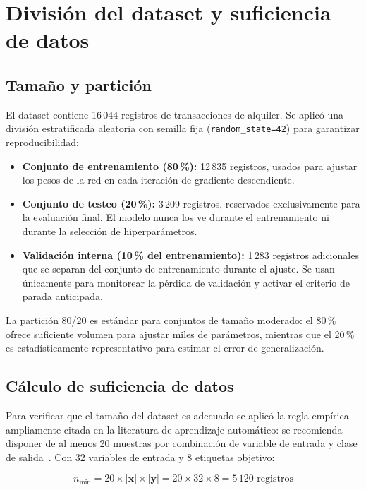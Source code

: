 \documentclass[12pt, a4paper]{report}
\begin{document}
\section{División del dataset y suficiencia de datos}

\subsection{Tamaño y partición}

El dataset contiene 16\,044 registros de transacciones de alquiler. Se aplicó una división estratificada aleatoria con semilla fija (\texttt{random\_state=42}) para garantizar reproducibilidad:

\begin{itemize}
  \item \textbf{Conjunto de entrenamiento (80\,\%):} 12\,835 registros, usados para ajustar los pesos de la red en cada iteración de gradiente descendiente.
  \item \textbf{Conjunto de testeo (20\,\%):} 3\,209 registros, reservados exclusivamente para la evaluación final. El modelo nunca los ve durante el entrenamiento ni durante la selección de hiperparámetros.
  \item \textbf{Validación interna (10\,\% del entrenamiento):} 1\,283 registros adicionales que se separan del conjunto de entrenamiento durante el ajuste. Se usan únicamente para monitorear la pérdida de validación y activar el criterio de parada anticipada.
\end{itemize}

La partición 80/20 es estándar para conjuntos de tamaño moderado: el 80\,\% ofrece suficiente volumen para ajustar miles de parámetros, mientras que el 20\,\% es estadísticamente representativo para estimar el error de generalización.

\subsection{Cálculo de suficiencia de datos}

Para verificar que el tamaño del dataset es adecuado se aplicó la regla empírica ampliamente citada en la literatura de aprendizaje automático: se recomienda disponer de al menos 20 muestras por combinación de variable de entrada y clase de salida~\cite{goodfellow2016}. Con 32 variables de entrada y 8 etiquetas objetivo:

\[
  n_{\min} = 20 \times |\mathbf{x}| \times |\mathbf{y}| = 20 \times 32 \times 8 = 5\,120 \text{ registros}
\]
\end{document}
